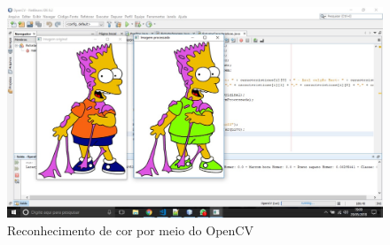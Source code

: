 \documentclass[12pt]{article}
\begin{document}
\begin{figure}[htt]
\centering
\includegraphics[width=.9\textwidth]{pintura.jpeg}
\caption{Reconhecimento de cor por meio do OpenCV}
\label{fig:exampleFig2}
\end{figure}

\end{document}
